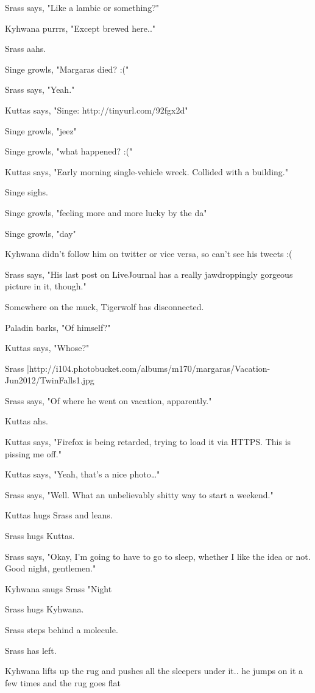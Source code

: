 Srass says, "Like a lambic or something?"

Kyhwana purrrs, "Except brewed here.."

Srass aahs.

Singe growls, "Margaras died? :("

Srass says, "Yeah."

Kuttas says, "Singe:  http://tinyurl.com/92fgx2d"

Singe growls, "jeez"

Singe growls, "what happened? :("

Kuttas says, "Early morning single-vehicle wreck. Collided with a building."

Singe sighs.

Singe growls, "feeling more and more lucky by the da"

Singe growls, "day"

Kyhwana didn't follow him on twitter or vice versa, so can't see his tweets :(

Srass says, "His last post on LiveJournal has a really jawdroppingly gorgeous picture in it, though."

Somewhere on the muck, Tigerwolf has disconnected.

Paladin barks, "Of himself?"

Kuttas says, "Whose?"

Srass |http://i104.photobucket.com/albums/m170/margaras/Vacation-Jun2012/TwinFalls1.jpg

Srass says, "Of where he went on vacation, apparently."

Kuttas ahs.

Kuttas says, "Firefox is being retarded, trying to load it via HTTPS. This is pissing me off."

Kuttas says, "Yeah, that's a nice photo\ldots{}"

Srass says, "Well.  What an unbelievably shitty way to start a weekend."

Kuttas hugs Srass and leans.

Srass hugs Kuttas.

Srass says, "Okay, I'm going to have to go to sleep, whether I like the idea or not.  Good night, gentlemen."

Kyhwana snugs Srass "Night

Srass hugs Kyhwana.

Srass steps behind a molecule.

Srass has left.

Kyhwana lifts up the rug and pushes all the sleepers under it.. he jumps on it a few times and the rug goes flat

